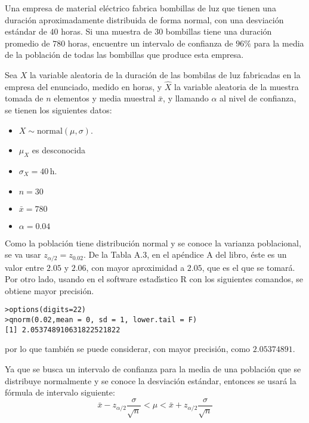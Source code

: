 \begin{enunciado}
 Una empresa de material el\'ectrico fabrica bombillas de luz que tienen una duraci\'on aproximadamente distribuida de forma normal, con una desviaci\'on est\'andar de $40$ horas.
 Si una muestra de $30$ bombillas tiene una duraci\'on promedio de $780$ horas, encuentre un intervalo de confianza de $96\%$ para la media de la poblaci\'on de todas las bombillas que produce esta empresa.
\end{enunciado}

\begin{solucion}
 Sea $X$ la variable aleatoria de la duraci\'on de las bombilas de luz fabricadas en la empresa del enunciado, medido en horas, y $\widehat{X}$ la variable aleatoria de la muestra tomada de $n$ elementos y media muestral $\bar{x}$, y llamando $\alpha$ al nivel de confianza, se tienen los siguientes datos:
 \begin{itemize}
  \item $X \sim \text{normal}(\mu, \sigma)$.
  \item $\mu_X$ es desconocida
  \item $\sigma_X = 40\,\text{h}$.
  \item $n = 30$
  \item $\bar{x} = 780$
  \item $\alpha = 0.04$
 \end{itemize}
 Como la poblaci\'on tiene distribuci\'on normal y se conoce la varianza poblacional, se va usar $z_{\alpha/2} = z_{0.02}$. De la Tabla A.3, en el ap\'endice A del libro, \'este es un valor entre $2.05$ y $2.06$, con mayor aproximidad a $2.05$, que es el que se tomar\'a. Por otro lado, usando en el software estad\'{\i}stico R con los siguientes comandos, se obtiene mayor precisi\'on.
  \begin{verbatim}
>options(digits=22)
>qnorm(0.02,mean = 0, sd = 1, lower.tail = F)
[1] 2.053748910631822521822
  \end{verbatim}
  \vspace{-0.5cm}
  por lo que tambi\'en se puede considerar, con mayor precisi\'on, como $2.05374891$.
 \par 
 Ya que se busca un intervalo de confianza para la media de una poblaci\'on que se distribuye normalmente y se conoce la desviaci\'on est\'andar, entonces se usar\'a la f\'ormula de intervalo siguiente:
 \begin{equation*}
  \bar{x} - z_{\alpha/2}\frac{\sigma}{\sqrt{n}} < \mu < \bar{x} + z_{\alpha/2}\frac{\sigma}{\sqrt{n}}
 \end{equation*}

\end{solucion}
